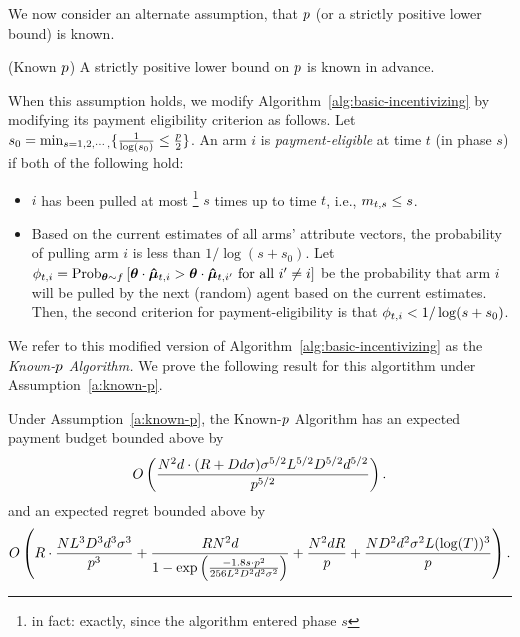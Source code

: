 We now consider an alternate assumption, that $p$ (or a strictly positive lower bound) is known.
\begin{assumption}
\label{a:known-p}
(Known $p$) 
A strictly positive lower bound on $p$ is known in advance.
\end{assumption}

When this assumption holds, we modify Algorithm~\ref{alg:basic-incentivizing} by modifying its payment eligibility criterion as follows.  Let $s_0=\min_{s=1,2,\cdots,}\{\frac{1}{\log(s_0)}\leq \frac{p}{2}\}$. An arm $i$ is \emph{payment-eligible} at time $t$ (in phase $s$)
if both of the following hold:
\begin{itemize}
\item $i$ has been pulled at most%
\footnote{in fact: exactly, since the algorithm entered phase $s$}
$s$ times up to time $t$, i.e., $m_{t,s} \leq s$.
\item Based on the current estimates  of all arms'
attribute vectors, the probability of pulling arm $i$ is less than $1/\log(s+s_0)$. Let $\PullProb{t}{i} = \Prob[\AgV \sim \AgentDist]{\AgV \cdot \ArmEV{t}{i} > \AgV
  \cdot \ArmEV{t}{i'} \mbox{ for all } i' \neq i}$
be the probability that arm $i$ will be pulled
by the next (random) agent based on the current estimates. 
Then, the second criterion for payment-eligibility is that
$\phi_{t,i} < 1/\log(s+s_0)$.
\end{itemize}

We refer to this modified version of Algorithm~\ref{alg:basic-incentivizing} as the {\it Known-$p$ Algorithm.} We prove the following result for this algortithm under Assumption~\ref{a:known-p}.

\begin{theorem}
\label{rst:known-p}
Under Assumption~\ref{a:known-p}, the Known-$p$ Algorithm has an expected payment budget bounded above by 
\begin{align*}
O \left(\frac{N^2 d \cdot (R + D d \sigma)\sigma^{5/2}L^{5/2}D^{5/2}d^{5/2}}{p^{5/2}} \right). 
\end{align*}
and an expected regret bounded above by
\begin{align}
O \left(R\cdot \frac{N L^3 D^3 d^3 \sigma^3}{p^3}
  + \frac{R N^2 d}{1 - \exp \left(
    \frac{-1.8 s \cdot p^2}{256 L^2 D^2 d^2 \sigma^2}
  \right)} +\frac{N^2 dR}{p}+\frac{ND^2 d^2\sigma^2 L(\log(T))^3}{p}\right).  \nonumber
\end{align}
\end{theorem}

